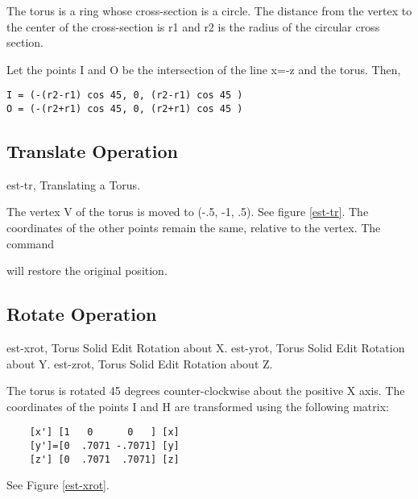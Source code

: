 The torus is a ring whose cross-section is a circle.  The distance from
the vertex to the center of the cross-section is r1 and r2 is the radius of
the circular cross section.

Let the points I and O be the intersection of the line x=-z and the torus.
Then,
\begin{center}
\begin{verbatim}
I = (-(r2-r1) cos 45, 0, (r2-r1) cos 45 )
O = (-(r2+r1) cos 45, 0, (r2+r1) cos 45 )
\end{verbatim}
\end{center}

\subsection{Translate Operation}
\mfig est-tr, Translating a Torus.


The vertex V of the torus is moved to (-.5, -1, .5).
See figure \ref{est-tr}.  The
coordinates of the other points remain the same, relative to the vertex.
The command


will restore the original position.

\subsection{Rotate Operation}
\mfig est-xrot, Torus Solid Edit Rotation about X.
\mfig est-yrot, Torus Solid Edit Rotation about Y.
\mfig est-zrot, Torus Solid Edit Rotation about Z.


The torus is rotated 45 degrees counter-clockwise about the positive X axis.
The
coordinates of the points I and H are transformed using the following matrix:
\begin{verbatim}
    [x'] [1   0      0   ] [x]
    [y']=[0  .7071 -.7071] [y]
    [z'] [0  .7071  .7071] [z]
\end{verbatim}
See Figure \ref{est-xrot}.

